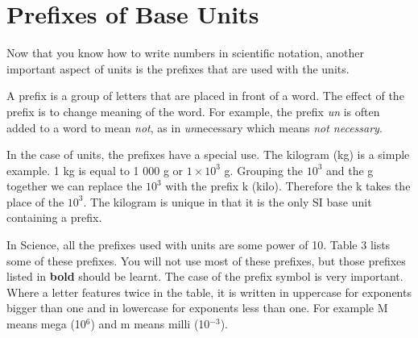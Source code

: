     \section{Prefixes of Base Units}
            \nopagebreak
      \label{m30853*id65208}Now that you know how to write numbers in scientific notation, another important aspect of units is the prefixes that are used with the units.\par 
{} {A prefix is a group of letters that are placed in front of a word. The effect of the prefix is to change meaning of the word. For example, the prefix \textsl{un} is often added to a word to mean \textsl{not}, as in \textsl{un}necessary which means \textsl{not necessary}. \par 
       } 
      \label{m30853*id65253}In the case of units, the prefixes have a special use. The kilogram (kg) is a simple example. 1 kg is equal to 1 000 g or $1\ensuremath{\times}{10}^{3}$ g. Grouping the ${10}^{3}$ and the g together we can replace the ${10}^{3}$ with the prefix k (kilo). Therefore the k takes the place of the ${10}^{3}$.
The kilogram is unique in that it is the only SI base unit containing a prefix.\par 
      \label{m30853*id65322}In Science, all the prefixes used with units are some power of 10. Table 3 lists some of these prefixes. You will not use most of these prefixes, but those prefixes listed in \textbf{bold} should be learnt. The case of the prefix symbol is very important. Where a letter features twice in the table, it is written in uppercase for exponents bigger than one and in lowercase for exponents less than one. For example M means mega (10${}^{6}$) and m means milli (10${}^{-3}$).\par 

